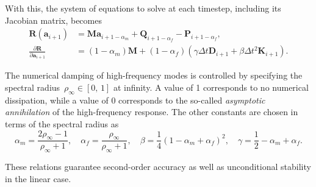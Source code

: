 With this, the system of equations to solve at each timestep, including its Jacobian matrix, becomes
%
\begin{align}
\boldsymbol{R}(\boldsymbol{a}_{i+1}) &= \boldsymbol{M}\boldsymbol{a}_{i+1-\alpha_m} + \boldsymbol{Q}_{i+1-\alpha_f} - \boldsymbol{P}_{i+1-\alpha_f}, \\
\frac{\partial \boldsymbol{R}}{\partial \boldsymbol{a}_{i+1}} &= (1 - \alpha_m)\boldsymbol{M} + (1 - \alpha_f)\left( \gamma \Delta t \boldsymbol{D}_{i+1} + \beta \Delta t^2 \boldsymbol{K}_{i+1} \right).
\end{align}

The numerical damping of high-frequency modes is controlled by specifying the spectral radius~$\rho_{\infty} \in [0,\,1]$ at infinity.
A value of 1 corresponds to no numerical dissipation, while a value of 0 corresponds to the so-called \textit{asymptotic annihilation} of the high-frequency response.
The other constants are chosen in terms of the spectral radius as
%
\begin{equation}
\alpha_m = \frac{2\rho_{\infty} - 1}{\rho_{\infty} + 1},\quad \alpha_f = \frac{\rho_{\infty}}{\rho_{\infty} + 1},\quad \beta = \frac{1}{4}\left(1 - \alpha_m + \alpha_f\right)^2,\quad \gamma = \frac{1}{2} - \alpha_m + \alpha_f.
\end{equation}

These relations guarantee second-order accuracy as well as unconditional stability in the linear case.
